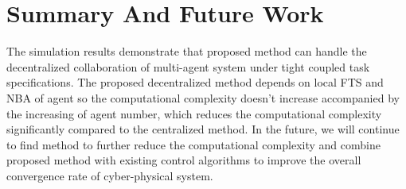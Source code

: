 \documentclass[journal]{IEEEtran}
\begin{document}
\section{Summary And Future Work}

The simulation results demonstrate that proposed method can handle the decentralized collaboration of multi-agent system under tight coupled task specifications. The proposed decentralized method depends on local FTS and NBA of agent so the computational complexity doesn't increase accompanied by the increasing of agent number, which reduces the computational complexity significantly compared to the centralized method. In the future, we will continue to find method to further reduce the computational complexity and combine proposed method with existing control algorithms to improve the overall convergence rate of cyber-physical system.


%
%
%
%





%
%
%
\end{document}
